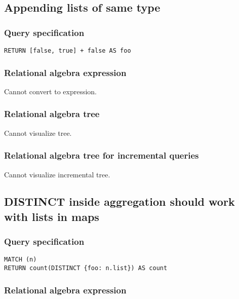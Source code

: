 \subsection{Appending lists of same type}

\subsubsection*{Query specification}

\begin{lstlisting}
RETURN [false, true] + false AS foo
\end{lstlisting}

\subsubsection*{Relational algebra expression}

Cannot convert to expression.

\subsubsection*{Relational algebra tree}

Cannot visualize tree.

\subsubsection*{Relational algebra tree for incremental queries}

Cannot visualize incremental tree.

\subsection{DISTINCT inside aggregation should work with lists in maps}

\subsubsection*{Query specification}

\begin{lstlisting}
MATCH (n)
RETURN count(DISTINCT {foo: n.list}) AS count
\end{lstlisting}

\subsubsection*{Relational algebra expression}

